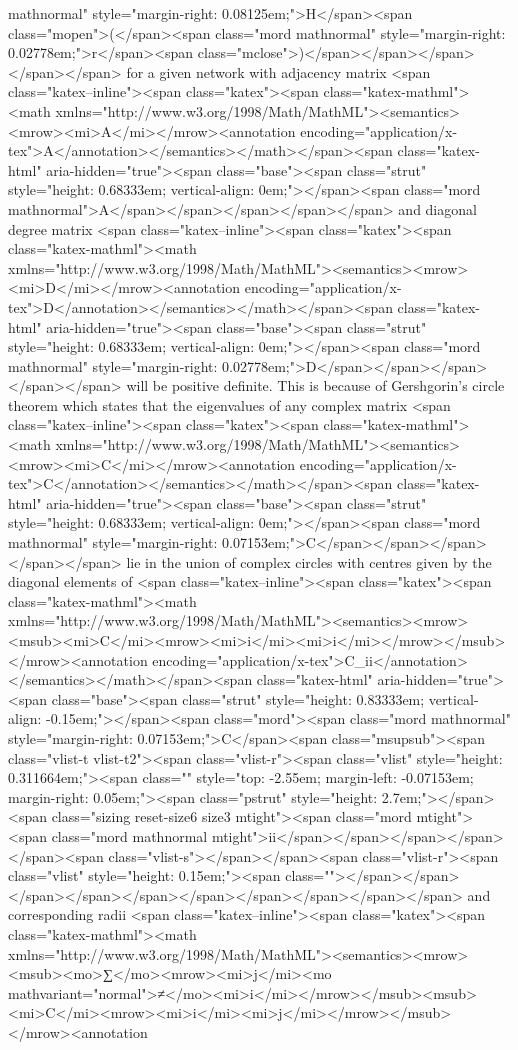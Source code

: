 mathnormal" style="margin-right: 0.08125em;">H</span><span class="mopen">(</span><span class="mord mathnormal" style="margin-right: 0.02778em;">r</span><span class="mclose">)</span></span></span></span></span> for a given network with adjacency matrix <span class="katex--inline"><span class="katex"><span class="katex-mathml"><math xmlns="http://www.w3.org/1998/Math/MathML"><semantics><mrow><mi>A</mi></mrow><annotation encoding="application/x-tex">A</annotation></semantics></math></span><span class="katex-html" aria-hidden="true"><span class="base"><span class="strut" style="height: 0.68333em; vertical-align: 0em;"></span><span class="mord mathnormal">A</span></span></span></span></span> and diagonal degree matrix <span class="katex--inline"><span class="katex"><span class="katex-mathml"><math xmlns="http://www.w3.org/1998/Math/MathML"><semantics><mrow><mi>D</mi></mrow><annotation encoding="application/x-tex">D</annotation></semantics></math></span><span class="katex-html" aria-hidden="true"><span class="base"><span class="strut" style="height: 0.68333em; vertical-align: 0em;"></span><span class="mord mathnormal" style="margin-right: 0.02778em;">D</span></span></span></span></span> will be positive definite. This is because of Gershgorin’s circle theorem which states that the eigenvalues of any complex matrix <span class="katex--inline"><span class="katex"><span class="katex-mathml"><math xmlns="http://www.w3.org/1998/Math/MathML"><semantics><mrow><mi>C</mi></mrow><annotation encoding="application/x-tex">C</annotation></semantics></math></span><span class="katex-html" aria-hidden="true"><span class="base"><span class="strut" style="height: 0.68333em; vertical-align: 0em;"></span><span class="mord mathnormal" style="margin-right: 0.07153em;">C</span></span></span></span></span> lie in the union of complex circles with centres given by the diagonal elements of <span class="katex--inline"><span class="katex"><span class="katex-mathml"><math xmlns="http://www.w3.org/1998/Math/MathML"><semantics><mrow><msub><mi>C</mi><mrow><mi>i</mi><mi>i</mi></mrow></msub></mrow><annotation encoding="application/x-tex">C_{ii}</annotation></semantics></math></span><span class="katex-html" aria-hidden="true"><span class="base"><span class="strut" style="height: 0.83333em; vertical-align: -0.15em;"></span><span class="mord"><span class="mord mathnormal" style="margin-right: 0.07153em;">C</span><span class="msupsub"><span class="vlist-t vlist-t2"><span class="vlist-r"><span class="vlist" style="height: 0.311664em;"><span class="" style="top: -2.55em; margin-left: -0.07153em; margin-right: 0.05em;"><span class="pstrut" style="height: 2.7em;"></span><span class="sizing reset-size6 size3 mtight"><span class="mord mtight"><span class="mord mathnormal mtight">ii</span></span></span></span></span><span class="vlist-s">​</span></span><span class="vlist-r"><span class="vlist" style="height: 0.15em;"><span class=""></span></span></span></span></span></span></span></span></span></span> and corresponding radii <span class="katex--inline"><span class="katex"><span class="katex-mathml"><math xmlns="http://www.w3.org/1998/Math/MathML"><semantics><mrow><msub><mo>∑</mo><mrow><mi>j</mi><mo mathvariant="normal">≠</mo><mi>i</mi></mrow></msub><msub><mi>C</mi><mrow><mi>i</mi><mi>j</mi></mrow></msub></mrow><annotation 